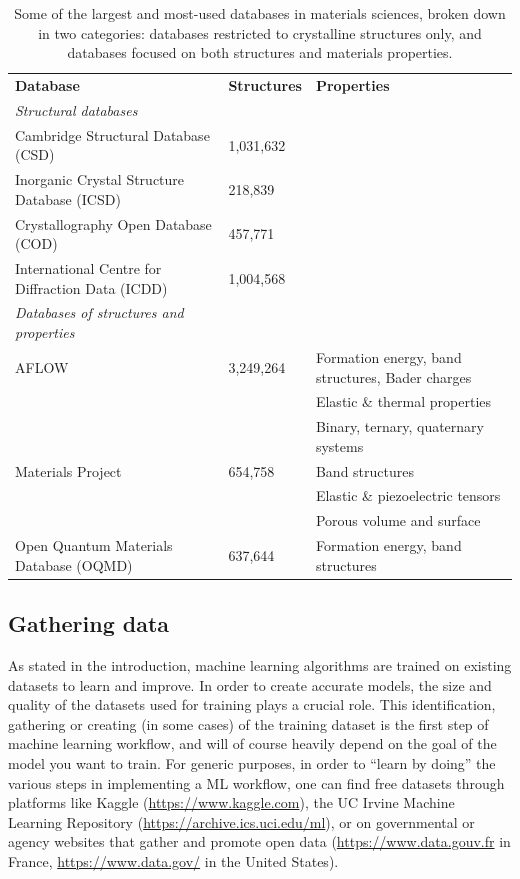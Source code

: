 \documentclass[aip,apm,amsmath,amssymb,reprint]{revtex4-2}
\begin{document}
\begin{table}
    \centering
    \setlength\tabcolsep{10pt}
    \begin{tabular}{lll}
\textbf{Database} & \textbf{Structures} & \textbf{Properties} \\[2mm]
\emph{Structural databases} \\\hline
Cambridge Structural Database (CSD)              & 1,031,632 \\
Inorganic Crystal Structure Database (ICSD)      & 218,839 \\
Crystallography Open Database (COD)              & 457,771 \\
International Centre for Diffraction Data (ICDD) & 1,004,568 \\[2mm]
\emph{Databases of structures and properties} \\\hline
AFLOW             & 3,249,264    & Formation energy, band structures, Bader charges \\
                  &              & Elastic \& thermal properties \\
                  &              & Binary, ternary, quaternary systems \\
Materials Project & 654,758      & Band structures \\
                  &              & Elastic \& piezoelectric tensors \\
                  &              & Porous volume and surface \\
Open Quantum Materials Database (OQMD)
                  & 637,644      & Formation energy, band structures \\

    \end{tabular}
    \caption{Some of the largest and most-used databases in materials sciences, broken down in two categories: databases restricted to crystalline structures only, and databases focused on both structures and materials properties.}
    \label{tab:repositories}
\end{table}


\subsection{Gathering data}

As stated in the introduction, machine learning algorithms are trained on existing datasets to learn and improve. In order to create accurate models, the size and quality of the datasets used for training plays a crucial role. This identification, gathering or creating (in some cases) of the training dataset is the first step of machine learning workflow, and will of course heavily depend on the goal of the model you want to train. For generic purposes, in order to ``learn by doing'' the various steps in implementing a ML workflow, one can find free datasets through platforms like Kaggle (\url{https://www.kaggle.com}), the UC Irvine Machine Learning Repository (\url{https://archive.ics.uci.edu/ml}), or on governmental or agency websites that gather and promote open data (\url{https://www.data.gouv.fr} in France, \url{https://www.data.gov/} in the United States).
\end{document}
